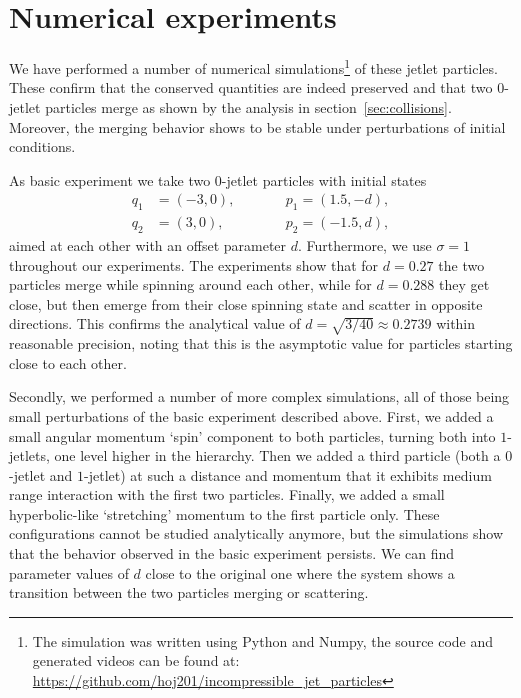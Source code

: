 \documentclass[12pt]{amsart}
\begin{document}
\section{Numerical experiments}
\label{sec:Numerical experiments}

We have performed a number of numerical simulations\footnote{%
  The simulation was written using Python and Numpy, the source code
  and generated videos can be found at:
  \url{https://github.com/hoj201/incompressible_jet_particles}%
} of these jetlet particles. These confirm that the conserved
quantities are indeed preserved and that two $0$-jetlet particles
merge as shown by the analysis in section~\ref{sec:collisions}.
Moreover, the merging behavior shows to be stable under perturbations
of initial conditions.

As basic experiment we take two $0$-jetlet particles with initial
states
\begin{equation}\label{eq:exp1-initial}
  \begin{alignedat}{2}
    q_1 &= (-3, 0), &\qquad& p_1 = ( 1.5,-d), \\
    q_2 &= ( 3, 0), &      & p_2 = (-1.5, d),
  \end{alignedat}
\end{equation}
aimed at each other with an offset parameter $d$. Furthermore, we use
$\sigma = 1$ throughout our experiments. The experiments show that for
$d = 0.27$ the two particles merge while spinning around each other,
while for $d = 0.288$ they get close, but then emerge from their close
spinning state and scatter in opposite directions. This confirms the
analytical value of $d = \sqrt{3/40} \approx 0.2739$ within reasonable
precision, noting that this is the asymptotic value for particles
starting close to each other.

Secondly, we performed a number of more complex simulations, all of
those being small perturbations of the basic experiment described
above. First, we added a small angular momentum `spin' component to
both particles, turning both into $1$-jetlets, one level higher in the
hierarchy. Then we added a third particle (both a $0$-jetlet and
$1$-jetlet) at such a distance and momentum that it exhibits medium
range interaction with the first two particles. Finally, we added a
small hyperbolic-like `stretching' momentum to the first particle
only. These configurations cannot be studied analytically anymore, but
the simulations show that the behavior observed in the basic
experiment persists. We can find parameter values of $d$ close to the
original one where the system shows a transition between the two
particles merging or scattering.
\end{document}

